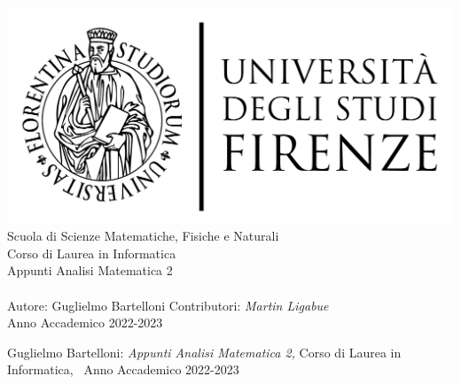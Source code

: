 \documentclass[11pt]{article}
\newcommand{\myDegree}{Corso di Laurea in Informatica}
\newcommand{\myName}{Guglielmo Bartelloni}
\newcommand{\myFaculty}{
	Scuola di Scienze Matematiche, Fisiche e Naturali}
\newcommand{\myUni}{\protect{
	Universit\`a degli Studi di Firenze}}
\newcommand{\myTime}{Anno Accademico 2022-2023}
\begin{document}
\begin{titlepage}
	\begin{center}
   	\large
      \hfill
      \vfill
      \begingroup
         \includegraphics[scale=0.15]{logo/LOGO}\\
			\myFaculty \\
			\myDegree \\ 
			\vspace{0.5cm}
         \vspace{0.5cm}    
      \endgroup 
      \vfill 
      \begingroup
      	\color{red} Appunti Analisi Matematica 2 \\ $\ $\\
	\bigskip
      \endgroup
      Autore: \myName
      \vfill 
      \vfill
      Contributori: \emph{Martin Ligabue}\\
      \vfill
      \vfill
      \myTime
      \vfill                      
	\end{center}        
\end{titlepage}   
   \newpage
	\thispagestyle{empty}
	\hfill
	\vfill
	\noindent\myName: 
	\textit{Appunti Analisi Matematica 2,} 
	\myDegree, \textcopyright\ \myTime

\newpage
\tableofcontents
\newpage
\thispagestyle{empty}




\newpage



\newpage


\end{document}

